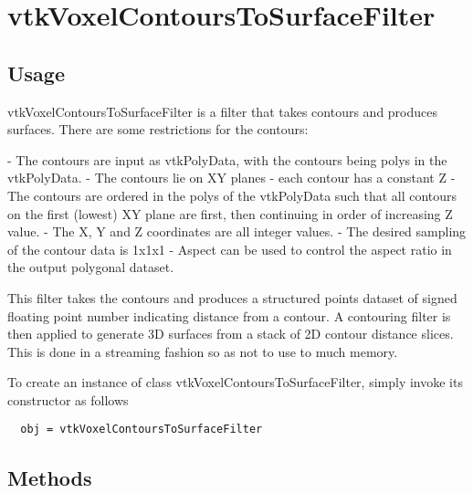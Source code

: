 \section{vtkVoxelContoursToSurfaceFilter}

\subsection{Usage}

 vtkVoxelContoursToSurfaceFilter is a filter that takes contours and
 produces surfaces. There are some restrictions for the contours:

   - The contours are input as vtkPolyData, with the contours being
     polys in the vtkPolyData.
   - The contours lie on XY planes - each contour has a constant Z
   - The contours are ordered in the polys of the vtkPolyData such 
     that all contours on the first (lowest) XY plane are first, then
     continuing in order of increasing Z value. 
   - The X, Y and Z coordinates are all integer values.
   - The desired sampling of the contour data is 1x1x1 - Aspect can
     be used to control the aspect ratio in the output polygonal
     dataset.

 This filter takes the contours and produces a structured points
 dataset of signed floating point number indicating distance from
 a contour. A contouring filter is then applied to generate 3D
 surfaces from a stack of 2D contour distance slices. This is 
 done in a streaming fashion so as not to use to much memory.

To create an instance of class vtkVoxelContoursToSurfaceFilter, simply
invoke its constructor as follows
\begin{verbatim}
  obj = vtkVoxelContoursToSurfaceFilter
\end{verbatim}
\subsection{Methods}

